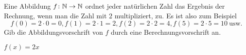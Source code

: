 \documentclass[]{uebungsblatt}
\begin{document}
\begin{exercise}
    Eine Abbildung $f\colon\mathbb{N}\rightarrow\mathbb{N}$ ordnet jeder natürlichen Zahl das Ergebnis der Rechnung, wenn man die Zahl mit $2$ multipliziert, zu. Es ist also zum Beispiel \[f(0)=2\cdot 0=0, f(1)=2\cdot 1=2, f(2)=2\cdot 2=4, f(5)=2\cdot 5=10~\text{usw.}\]
    Gib die Abbildungsvorschrift von $f$ durch eine Berechnungsvorschrift an.
    \begin{answerbox}[0.5in]
        $f(x)=2x$
    \end{answerbox}
\end{exercise}

\end{document}
